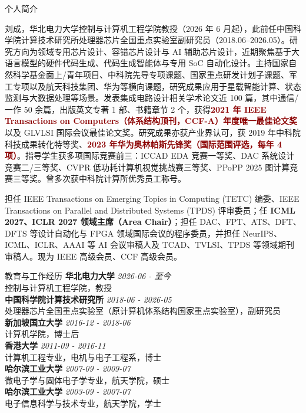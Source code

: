 \documentclass{resume}
\begin{document}
\begin{rSection}{个人简介}
    \vspace{-1em}
\item 刘成，华北电力大学控制与计算机工程学院教授（2026 年 6 月起），此前任中国科学院计算技术研究所处理器芯片全国重点实验室副研究员（2018.06--2026.05）。研究方向为领域专用芯片设计、容错芯片设计与 AI 辅助芯片设计，近期聚焦基于大语言模型的硬件代码生成、代码生成智能体与专用 SoC 自动化设计。主持国家自然科学基金面上/青年项目、中科院先导专项课题、国家重点研发计划子课题、军工专项以及航天科技集团、华为等横向课题，研究成果应用于星载智能计算、状态监测与大数据处理等场景。发表集成电路设计相关学术论文近 100 篇，其中通信/一作 50 余篇，出版英文专著 1 部、书籍章节 2 个，获得\textcolor{darkred}{\textbf{2021 年 IEEE Transactions on Computers（体系结构顶刊，CCF-A）年度唯一最佳论文奖}}以及 GLVLSI 国际会议最佳论文奖。研究成果亦获产业界认可，获 2019 年中科院科技成果转化特等奖、\textcolor{darkred}{\textbf{2023 年华为奥林帕斯先锋奖（国际范围评选，每年 4 项）}}。指导学生获多项国际竞赛前三：ICCAD EDA 竞赛一等奖、DAC 系统设计竞赛二/三等奖、CVPR 低功耗计算机视觉挑战赛三等奖、PPoPP 2025 图计算竞赛三等奖。曾多次获中科院计算所优秀员工称号。

担任 IEEE Transactions on Emerging Topics in Computing (TETC) 编委、IEEE Transactions on Parallel and Distributed Systems (TPDS) 评审委员；任 \textbf{ICML 2027、ICLR 2027 领域主席（Area Chair）}；担任 DAC、FPT、ATS、DFT、DFTS 等设计自动化与 FPGA 领域国际会议的程序委员，并担任 NeurIPS、ICML、ICLR、AAAI 等 AI 会议审稿人及 TCAD、TVLSI、TPDS 等领域期刊审稿人。现为 IEEE 高级会员、CCF 高级会员。
    \vspace{-0.5em}
\end{rSection}

\begin{rSection}{教育与工作经历}
{\bf 华北电力大学} \hfill {\em 2026-06 - 至今} \\
控制与计算机工程学院，教授\\[0.3em]
{\bf 中国科学院计算技术研究所} \hfill {\em 2018-06 - 2026-05} \\
处理器芯片全国重点实验室（原计算机体系结构国家重点实验室），副研究员\\[0.3em]
{\bf 新加坡国立大学} \hfill {\em 2016-12 - 2018-06} \\
计算机学院，博士后\\[0.3em]
{\bf 香港大学} \hfill {\em 2011-09 - 2016-11} \\
计算机工程专业，电机与电子工程系，博士\\[0.3em]
{\bf 哈尔滨工业大学} \hfill {\em 2007-09 - 2009-07} \\
微电子学与固体电子学专业，航天学院，硕士\\[0.3em]
{\bf 哈尔滨工业大学} \hfill {\em 2003-09 - 2007-07} \\
电子信息科学与技术专业，航天学院，学士
\end{rSection}
\end{document}
